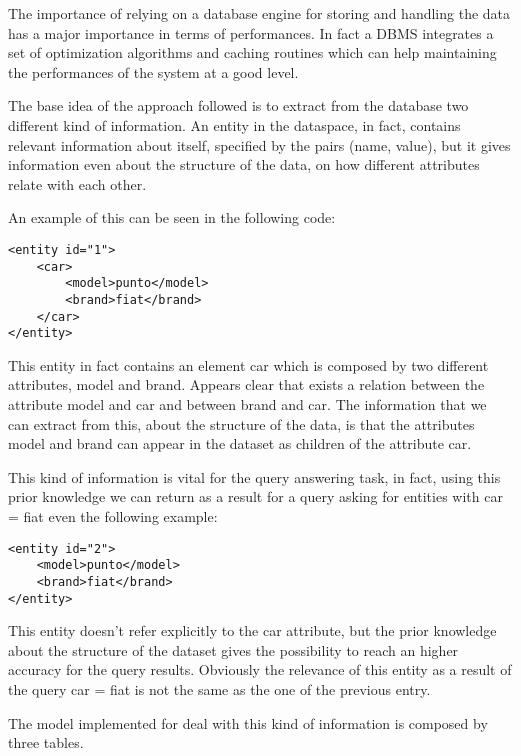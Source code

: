 \documentclass{acm_proc_article-sp-sigmod07}
\begin{document}
The importance of relying on a database engine for storing and handling the
data has a major importance in terms of performances. In fact a DBMS
integrates a set of optimization algorithms and caching routines which can
help maintaining the performances of the system at a good level.

The base idea of the approach followed is to extract from the database two
different kind of information. An entity in the dataspace, in fact,
contains relevant information about itself, specified by the pairs
(name, value), but it gives information even about the structure of the
data, on how different attributes relate with each other.

An example of this can be seen in the following code:

\begin{verbatim}
<entity id="1">
    <car>
        <model>punto</model>
        <brand>fiat</brand>
    </car>
</entity>
\end{verbatim}

This entity in fact contains an element car which is composed by two
different attributes, model and brand. Appears clear that exists a
relation between the attribute model and car and between brand and car.
The information that we can extract from this, about the structure of the
data, is that the attributes model and brand can appear in the dataset as
children of the attribute car.

This kind of information is vital for the query answering task, in fact,
using this prior knowledge we can return as a result for a query asking
for entities with car = fiat even the following example: 

\begin{verbatim}
<entity id="2">
    <model>punto</model>
    <brand>fiat</brand>
</entity>
\end{verbatim}

This entity doesn't refer explicitly to the car attribute, but the prior
knowledge about the structure of the dataset gives the possibility to
reach an higher accuracy for the query results.
Obviously the relevance of this entity as a result of the query car = fiat
is not the same as the one of the previous entry.

The model implemented for deal with this kind of information is composed
by three tables.




\end{document}
